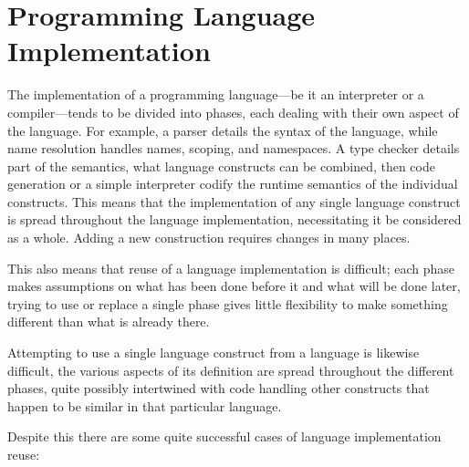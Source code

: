 \documentclass{kththesis}
\begin{document}
\section{Programming Language Implementation} \label{sec:compiler-design}

The implementation of a programming language---be it an interpreter or a compiler---tends to be divided into phases, each dealing with their own aspect of the language. For example, a parser details the syntax of the language, while name resolution handles names, scoping, and namespaces. A type checker details part of the semantics, what language constructs can be combined, then code generation or a simple interpreter codify the runtime semantics of the individual constructs. This means that the implementation of any single language construct is spread throughout the language implementation, necessitating it be considered as a whole. Adding a new construction requires changes in many places.

This also means that reuse of a language implementation is difficult; each phase makes assumptions on what has been done before it and what will be done later, trying to use or replace a single phase gives little flexibility to make something different than what is already there.

Attempting to use a single language construct from a language is likewise difficult, the various aspects of its definition are spread throughout the different phases, quite possibly intertwined with code handling other constructs that happen to be similar in that particular language.

Despite this there are some quite successful cases of language implementation reuse:
\end{document}

